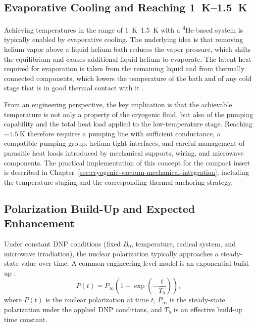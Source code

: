 \documentclass[FM,DP,EN,twoside]{tulthesis}
\begin{document}
\subsection{Evaporative Cooling and Reaching \SIrange{1}{1.5}{\kelvin}}
\label{subsec:evaporative-cooling-1k-1p5k}
Achieving temperatures in the range of \SIrange{1}{1.5}{\kelvin} with a \textsuperscript{4}He-based system is typically enabled by evaporative cooling. The underlying idea is that removing helium vapor above a liquid helium bath reduces the vapor pressure, which shifts the equilibrium and causes additional liquid helium to evaporate. The latent heat required for evaporation is taken from the remaining liquid and from thermally connected components, which lowers the temperature of the bath and of any cold stage that is in good thermal contact with it \cite{feynman_1955}.

From an engineering perspective, the key implication is that the achievable temperature is not only a property of the cryogenic fluid, but also of the pumping capability and the total heat load applied to the low-temperature stage. Reaching $\sim \SI{1.5}{\kelvin}$ therefore requires a pumping line with sufficient conductance, a compatible pumping group, helium-tight interfaces, and careful management of parasitic heat loads introduced by mechanical supports, wiring, and microwave components. The practical implementation of this concept for the compact insert is described in Chapter~\ref{sec:cryogenic-vacuum-mechanical-integration}, including the temperature staging and the corresponding thermal anchoring strategy.


\subsection{Polarization Build-Up and Expected Enhancement}
\label{subsec:polarization-buildup-enhancement}
Under constant DNP conditions (fixed $B_0$, temperature, radical system, and microwave irradiation), the nuclear polarization typically approaches a steady-state value over time. A common engineering-level model is an exponential build-up \cite{dissolution_dnp_workflow_ref}:
\begin{equation}
P(t) = P_\infty \left(1 - \exp\!\left(-\frac{t}{T_\mathrm{b}}\right)\right),
\label{eq:dnp-buildup}
\end{equation}
where $P(t)$ is the nuclear polarization at time $t$, $P_\infty$ is the steady-state polarization under the applied DNP conditions, and $T_\mathrm{b}$ is an effective build-up time constant.
\end{document}
